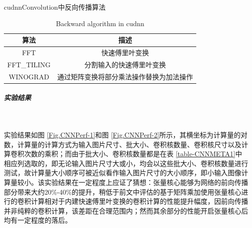 \begin{table}
	\centering
	\renewcommand{\thetable}{\arabic{section}-\arabic{table} }
	\renewcommand{\tablename}{表}
	\caption{cudnnConvolution中反向传播算法}
	\addtocounter{table}{-1}
	\renewcommand{\thetable}{\arabic{section}-\arabic{table} }
	\renewcommand{\tablename}{Table}
	\caption{Backward algorithm in cudnn}
	\begin{tabular}{cc}
		\toprule
		算法 & 描述\\
		\midrule
		FFT & 快速傅里叶变换\\
		FFT\_TILING & 分割输入的快速傅里叶变换\\
		WINOGRAD & 通过矩阵变换将部分乘法操作替换为加法操作\\
		\bottomrule
	\end{tabular} \label{table-BWDALGO} 
\end{table}
\subparagraph{实验结果}~{}
\par 实验结果如图 \ref{Fig.CNNPerf-1}和图 \ref{Fig.CNNPerf-2}所示，其横坐标为计算量的对数，计算量的计算方式为输入图片尺寸、批大小、卷积核数量、卷积核尺寸以及计算卷积次数的乘积；而由于批大小、卷积核数量都是在表 \ref{table-CNNMETA1}中相应列选取的，即无论输入图片尺寸大或小，均会以这些批大小、卷积核数量进行测试，故计算量大小顺序可被近似看作输入图片尺寸的大小顺序，即小输入图像计算量较小。该实验结果在一定程度上应证了猜想：张量核心能够为网络的前向传播部分带来大约20\%-40\%的提升，稍低于前文中评估的基于矩阵乘加使用张量核心进行的卷积计算相对于内建快速傅里叶变换的卷积计算的性能提升幅度，因前向传播并非纯粹的卷积计算，该差距在合理范围内；然而其余部分的性能开启张量核心后均有一定程度的落后。

